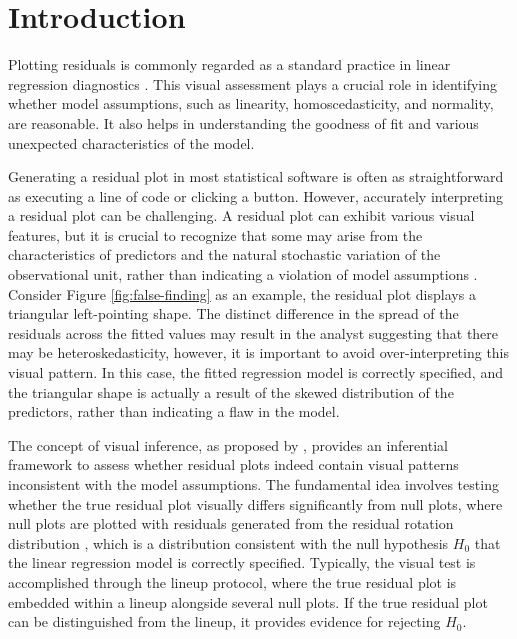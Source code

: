 \documentclass[]{interact}
\theoremstyle{plain}%
\theoremstyle{definition}
\theoremstyle{remark}
\begin{document}
\section{Introduction}\label{sec-model-introduction}

Plotting residuals is commonly regarded as a standard practice in linear
regression diagnostics \citep{belsley1980regression, cook1982residuals}.
This visual assessment plays a crucial role in identifying whether model
assumptions, such as linearity, homoscedasticity, and normality, are
reasonable. It also helps in understanding the goodness of fit and
various unexpected characteristics of the model.

Generating a residual plot in most statistical software is often as
straightforward as executing a line of code or clicking a button.
However, accurately interpreting a residual plot can be challenging. A
residual plot can exhibit various visual features, but it is crucial to
recognize that some may arise from the characteristics of predictors and
the natural stochastic variation of the observational unit, rather than
indicating a violation of model assumptions \citep{li2024plot}. Consider
Figure \ref{fig:false-finding} as an example, the residual plot displays
a triangular left-pointing shape. The distinct difference in the spread
of the residuals across the fitted values may result in the analyst
suggesting that there may be heteroskedasticity, however, it is
important to avoid over-interpreting this visual pattern. In this case,
the fitted regression model is correctly specified, and the triangular
shape is actually a result of the skewed distribution of the predictors,
rather than indicating a flaw in the model.

The concept of visual inference, as proposed by
\citet{buja2009statistical}, provides an inferential framework to assess
whether residual plots indeed contain visual patterns inconsistent with
the model assumptions. The fundamental idea involves testing whether the
true residual plot visually differs significantly from null plots, where
null plots are plotted with residuals generated from the residual
rotation distribution \citep{langsrud2005rotation}, which is a
distribution consistent with the null hypothesis \(H_0\) that the linear
regression model is correctly specified. Typically, the visual test is
accomplished through the lineup protocol, where the true residual plot
is embedded within a lineup alongside several null plots. If the true
residual plot can be distinguished from the lineup, it provides evidence
for rejecting \(H_0\).
\end{document}
